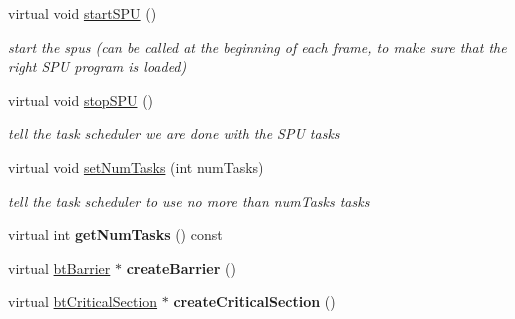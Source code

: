 \begin{DoxyCompactItemize}
\mbox{\label{classPosixThreadSupport_ac9816781a7ba8230694a6376ae1211a6}} 
virtual void \hyperlink{classPosixThreadSupport_ac9816781a7ba8230694a6376ae1211a6}{start\+S\+PU} ()
\begin{DoxyCompactList}\small\item\em start the spus (can be called at the beginning of each frame, to make sure that the right S\+PU program is loaded) \end{DoxyCompactList}\item 
\mbox{\label{classPosixThreadSupport_a02c5ba9465573be81a6d51baf2095f86}} 
virtual void \hyperlink{classPosixThreadSupport_a02c5ba9465573be81a6d51baf2095f86}{stop\+S\+PU} ()
\begin{DoxyCompactList}\small\item\em tell the task scheduler we are done with the S\+PU tasks \end{DoxyCompactList}\item 
\mbox{\label{classPosixThreadSupport_a8036f513f0c6f9116b60cafa021a9a1f}} 
virtual void \hyperlink{classPosixThreadSupport_a8036f513f0c6f9116b60cafa021a9a1f}{set\+Num\+Tasks} (int num\+Tasks)
\begin{DoxyCompactList}\small\item\em tell the task scheduler to use no more than num\+Tasks tasks \end{DoxyCompactList}\item 
\mbox{\label{classPosixThreadSupport_a428b91ba73a254683a4056cbac56d265}} 
virtual int {\bfseries get\+Num\+Tasks} () const
\item 
\mbox{\label{classPosixThreadSupport_a9f9ea3e90b6fd7dbd738f4f915f5b519}} 
virtual \hyperlink{classbtBarrier}{bt\+Barrier} $\ast$ {\bfseries create\+Barrier} ()
\item 
\mbox{\label{classPosixThreadSupport_abf35345ee890bb605f1a11e39cd7e64e}} 
virtual \hyperlink{classbtCriticalSection}{bt\+Critical\+Section} $\ast$ {\bfseries create\+Critical\+Section} ()
\item 
\mbox{\label{classPosixThreadSupport_a3534b684c4aee718c0af2a342eb13a05}} 

\end{DoxyCompactItemize}
